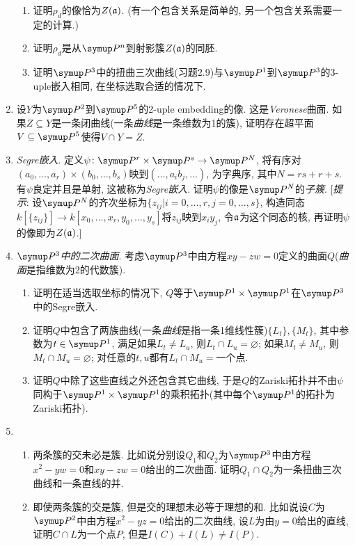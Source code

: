 \begin{enumerate}
\begin{enumerate}
            \item 证明$\rho_d$的像恰为$Z(\mathfrak{a})$. (有一个包含关系是简单的, 另一个包含关系需要一定的计算.)
            \item 证明$\rho_d$是从$\Pn$到射影簇$Z(\mathfrak{a})$的同胚.
            \item 证明$\PP{3}$中的扭曲三次曲线(习题2.9)与$\PP{1}$到$\PP{3}$的3-uple嵌入相同, 在坐标选取合适的情况下.
        \end{enumerate}
    \item 设$Y$为$\PP{2}$到$\PP{5}$的2-uple embedding的像. 这是\emph{Veronese}曲面. 如果$Z\subseteq Y$是一条闭曲线(一条\emph{曲线}是一条维数为1的簇), 证明存在超平面$V\subseteq\PP{5}$使得$V\cap Y=Z$.
    \item \emph{Segre嵌入}. 定义$\psi\colon \PP{r}\times\PP{s}\to\PP{N}$, 将有序对$(a_0, \dotsc, a_r)\times(b_0, \dotsc, b_s)$映到$(\dotsc, a_ib_j, \dotsc)$, 为字典序, 其中$N = rs+r+s$. 有$\psi$良定并且是单射, 这被称为\emph{Segre嵌入}. 证明$\psi$的像是$\PP{N}$的\emph{子簇}. [\emph{提示}: 设$\PP{N}$的齐次坐标为$\{z_{ij}\vert i=0, \dotsc, r, j=0, \dotsc, s\}$, 构造同态$k[\{z_{ij}\}]\to k[x_0, \dotsc, x_r, y_0, \dotsc, y_s]$将$z_{ij}$映到$x_iy_j$, 令$\mathfrak{a}$为这个同态的核, 再证明$\psi$的像即为$Z(\mathfrak{a})$.]
    \item \emph{$\PP{3}$中的二次曲面}. 考虑$\PP{3}$中由方程$xy-zw=0$定义的曲面$Q$(\emph{曲面}是指维数为2的代数簇).
        \begin{enumerate}
            \item 证明在适当选取坐标的情况下, $Q$等于$\PP{1}\times\PP{1}$在$\PP{3}$中的Segre嵌入.
            \item 证明$Q$中包含了两族曲线(一条\emph{曲线}是指一条1维线性簇)$\{L_t\}, \{M_t\}$, 其中参数为$t\in \PP{1}$, 满足如果$L_t\neq L_u$, 则$L_t\cap L_u = \varnothing$; 如果$M_t\neq M_u$, 则$M_t\cap M_u=\varnothing$; 对任意的$t, u$都有$L_t\cap M_u = \text{一个点}$.
            \item 证明$Q$中除了这些直线之外还包含其它曲线, 于是$Q$的Zariski拓扑并不由$\psi$同构于$\PP{1}\times\PP{1}$的乘积拓扑(其中每个$\PP{1}$的拓扑为Zariski拓扑).
        \end{enumerate}
    \item
        \begin{enumerate}
            \item 两条簇的交未必是簇. 比如说分别设$Q_1$和$Q_2$为$\PP{3}$中由方程$x^2-yw=0$和$xy-zw=0$给出的二次曲面. 证明$Q_1\cap Q_2$为一条扭曲三次曲线和一条直线的并.
            \item 即使两条簇的交是簇, 但是交的理想未必等于理想的和. 比如说设$C$为$\PP{2}$中由方程$x^2-yz=0$给出的二次曲线, 设$L$为由$y=0$给出的直线, 证明$C\cap L$为一个点$P$, 但是$I(C)+I(L)\neq I(P)$.

\end{enumerate}
\end{enumerate}

